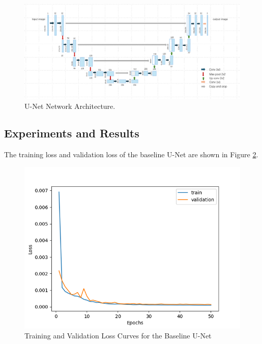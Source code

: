\documentclass{article}
\begin{document}
\begin{figure}[H]
  \centering
  \includegraphics[width=1\linewidth]{../result/network.png}
  \caption{U-Net Network Architecture.}
  \label{fig:network_architecture}
\end{figure}

\subsection{Experiments and Results}
The training loss and validation loss of the baseline U-Net are shown in Figure \ref{fig:baseline_unet_loss}.
\begin{figure}[H]
  \centering
  \includegraphics[width=0.8\linewidth]{../result/baseline_unet.png}
  \caption{Training and Validation Loss Curves for the Baseline U-Net}
  \label{fig:baseline_unet_loss}
\end{figure}
\end{document}

